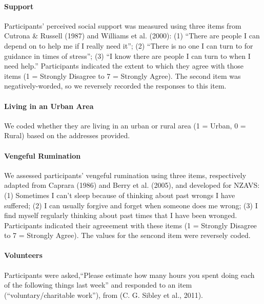 \documentclass[
  letterpaper,
  DIV=11,
  numbers=noendperiod]{scrartcl}
\let\oldparagraph\paragraph
\renewcommand{\paragraph}[1]{\oldparagraph{#1}\mbox{}}
\begin{document}
\hypertarget{support}{%
\paragraph{Support}\label{support}}

Participants' perceived social support was measured using three items
from Cutrona \& Russell (1987) and Williams et al. (2000): (1) ``There
are people I can depend on to help me if I really need it''; (2) ``There
is no one I can turn to for guidance in times of stress''; (3) ``I know
there are people I can turn to when I need help.'' Participants
indicated the extent to which they agree with those items (1 = Strongly
Disagree to 7 = Strongly Agree). The second item was negatively-worded,
so we reversely recorded the responses to this item.

\hypertarget{living-in-an-urban-area}{%
\paragraph{Living in an Urban Area}\label{living-in-an-urban-area}}

We coded whether they are living in an urban or rural area (1 = Urban, 0
= Rural) based on the addresses provided.

\hypertarget{vengeful-rumination}{%
\paragraph{Vengeful Rumination}\label{vengeful-rumination}}

We assessed participants' vengeful rumination using three items,
respectively adapted from Caprara (1986) and Berry et al. (2005), and
developed for NZAVS: (1) Sometimes I can't sleep because of thinking
about past wrongs I have suffered; (2) I can usually forgive and forget
when someone does me wrong; (3) I find myself regularly thinking about
past times that I have been wronged. Participants indicated their
agreeement with these items (1 = Strongly Disagree to 7 = Strongly
Agree). The values for the sencond item were reversely coded.

\hypertarget{volunteers}{%
\paragraph{Volunteers}\label{volunteers}}

Participants were asked,``Please estimate how many hours you spent doing
each of the following things last week'' and responded to an item
(``voluntary/charitable work''), from (C. G. Sibley et al., 2011).
\end{document}
